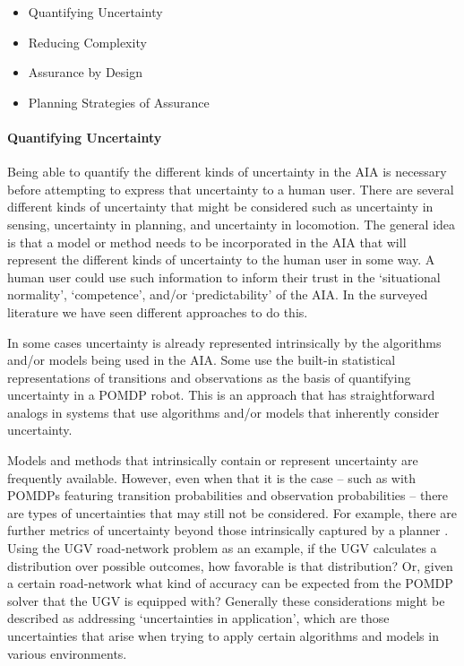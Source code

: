     \begin{itemize}
        \item Quantifying Uncertainty
        \item Reducing Complexity
        \item Assurance by Design
        \item Planning Strategies of Assurance
    \end{itemize}

    \paragraph{Quantifying Uncertainty} Being able to quantify the different kinds of uncertainty in the AIA is necessary before attempting to express that uncertainty to a human user. There are several different kinds of uncertainty that might be considered such as uncertainty in sensing, uncertainty in planning, and uncertainty in locomotion. The general idea is that a model or method needs to be incorporated in the AIA that will represent the different kinds of uncertainty to the human user in some way. A human user could use such information to inform their trust in the `situational normality', `competence', and/or `predictability' of the AIA. In the surveyed literature we have seen different approaches to do this.  

    In some cases uncertainty is already represented intrinsically by the algorithms and/or models being used in the AIA. Some use the built-in statistical representations of transitions and observations as the basis of quantifying uncertainty in a POMDP robot. This is an approach that has straightforward analogs in systems that use algorithms and/or models that inherently consider uncertainty.

    Models and methods that intrinsically contain or represent uncertainty are frequently available. However, even when that it is the case -- such as with POMDPs featuring transition probabilities and observation probabilities -- there are types of uncertainties that may still not be considered. For example, there are further metrics of uncertainty beyond those intrinsically captured by a planner \cite{Aitken2016-fb,Kuter2012-bv}. Using the UGV road-network problem as an example, if the UGV calculates a distribution over possible outcomes, how favorable is that distribution? Or, given a certain road-network what kind of accuracy can be expected from the POMDP solver that the UGV is equipped with? Generally these considerations might be described as addressing `uncertainties in application', which are those uncertainties that arise when trying to apply certain algorithms and models in various environments.


